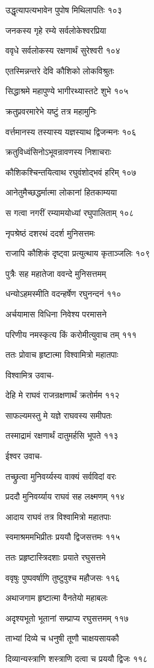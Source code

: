 उद्धृत्यापत्यभावेन पुपोष मिथिलापतिः १०३

जनकस्य गृहे रम्ये सर्वलोकेश्वरप्रिया

ववृधे सर्वलोकस्य रक्षणार्थं सुरेश्वरी १०४

एतस्मिन्नन्तरे देवि कौशिको लोकविश्रुतः

सिद्धाश्रमे महापुण्ये भागीरथ्यास्तटे शुभे १०५

क्रतुप्रवरमारेभे यष्टुं तत्र महामुनिः

वर्त्तमानस्य तस्यास्य यज्ञस्याथ द्विजन्मनः १०६

क्रतुविध्वंसिनोऽभूवन्रावणस्य निशाचराः

कौशिकश्चिन्तयित्वाथ रघुवंशोद्भवं हरिम् १०७

आनेतुमैच्छद्धर्मात्मा लोकानां हितकाम्यया

स गत्वा नगरीं रम्यामयोध्यां रघुपालिताम् १०८

नृपश्रेष्ठं दशरथं ददर्श मुनिसत्तमः

राजापि कौशिकं दृष्ट्वा प्रत्युत्थाय कृताञ्जलिः १०९

पुत्रैः सह महातेजा ववन्दे मुनिसत्तमम्

धन्योऽहमस्मीति वदन्हर्षेण रघुनन्दनं ११०

अर्चयामास विधिना निवेश्य परमासने

परिणीय नमस्कृत्य किं करोमीत्युवाच तम् १११

ततः प्रोवाच हृष्टात्मा विश्वामित्रो महातपाः

विश्वामित्र उवाच-

देहि मे राघवं राजन्रक्षणार्थं क्रतोर्मम ११२

साफल्यमस्तु मे यज्ञे राघवस्य समीपतः

तस्माद्रामं रक्षणार्थं दातुमर्हसि भूपते ११३

ईश्वर उवाच-

तच्छ्रुत्वा मुनिवर्य्यस्य वाक्यं सर्वविदां वरः

प्रददौ मुनिवर्य्याय राघवं सह लक्ष्मणम् ११४

आदाय राघवं तत्र विश्वामित्रो महातपाः

स्वमाश्रममभिप्रीतः प्रययौ द्विजसत्तमः ११५

ततः प्रहृष्टास्त्रिदशाः प्रयाते रघुसत्तमे

ववृषुः पुष्पवर्षाणि तुष्टुवुश्च महौजसः ११६

अथाजगाम हृष्टात्मा वैनतेयो महाबलः

अदृश्यभूतो भूतानां सम्प्राप्य रघुसत्तमम् ११७

ताभ्यां दिव्ये च धनुषी तूणौ चाक्षयसायकौ

दिव्यान्यस्त्राणि शस्त्राणि दत्वा च प्रययौ द्विजः ११८


